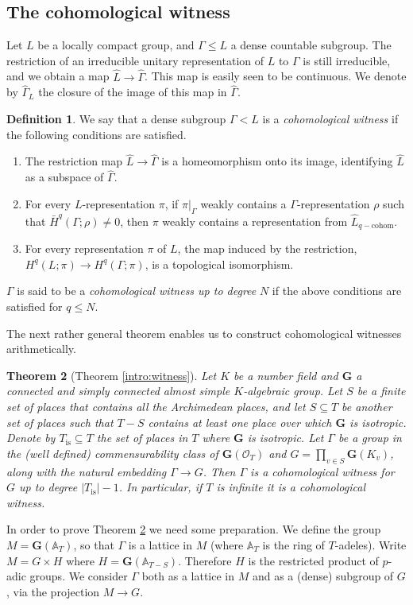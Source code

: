 \documentclass[12pt,reqno]{amsart}
\newtheorem{theorem}{Theorem}[section]
\theoremstyle{definition}
\newtheorem{definition}[theorem]{Definition}
\newcommand{\barH}{\bar{H}}
\newcommand{\abs}[1]{\left| #1 \right|}
\begin{document}
\subsection{The cohomological witness}\label{subsec:5.1}
Let $L$ be a locally compact group, and $\Gamma \leq L$ a dense countable subgroup. The restriction of an irreducible unitary representation of $L$ to $\Gamma$ is still irreducible, and we obtain a map $\widehat{L}\to \widehat{\Gamma}$. This map is easily seen to be continuous. We denote by $\widehat{\Gamma}_L$ the closure of the image of this map in $\widehat{\Gamma}$.
\begin{definition}
    We say that a dense subgroup $\Gamma<L$ is a \emph{cohomological witness} if the following conditions are satisfied.
    \begin{enumerate}
       \item The restriction map $\widehat{L}\to \widehat{\Gamma}$ is a homeomorphism onto its image, identifying $\widehat{L}$ as a subspace of $\widehat{\Gamma}$.
       \item For every $L$-representation $\pi$, if $\pi|_{\Gamma}$ weakly contains a $\Gamma$-representation $\rho$ such that $\barH^q(\Gamma;\rho) \ne 0$, then $\pi$ weakly contains a representation from $\widehat{L}_{q-\mathrm{cohom}}$.
       \item For every representation $\pi$ of $L$, the map induced by the restriction, $H^q(L;\pi) \to H^q(\Gamma;\pi)$, is a topological isomorphism.
    \end{enumerate}
    $\Gamma$ is said to be a \textit{cohomological witness up to degree} $N$ if the above conditions are satisfied for $q \leq N$.
\end{definition}
The next rather general theorem enables us to construct cohomological witnesses arithmetically. 
\begin{theorem}[Theorem \ref{intro:witness}]\label{main:wittness}
    Let $K$ be a number field and $\mathbf{G}$ a
    connected and simply connected almost simple $K$-algebraic group.
    Let $S$ be a finite set of places that contains all the Archimedean places, and let $S \subseteq T$ be another set of places such that $T - S$ contains at least one place over which $\mathbf{G}$ is isotropic. Denote by $T_{\mathrm{is}} \subseteq T$ the set of places in $T$ where $\mathbf{G}$ is isotropic.  Let $\Gamma$ be a group in the (well defined) commensurability class of $\mathbf{G}(\mathcal{O}_T)$ and $G=\prod_{v \in S} \mathbf{G}(K_v)$, along with the natural embedding $\Gamma\to G$. 
    Then $\Gamma$ is a cohomological witness for $G$ up to degree $|T_{\mathrm{is}}|-1$. In particular, if $T$ is infinite it is a cohomological witness.
\end{theorem}
In order to prove Theorem \ref{main:wittness} we need some preparation. We define the group $M=\mathbf{G}(\mathbb{A}_T)$, so that $\Gamma$ is a lattice in $M$ (where $\mathbb{A}_T$ is the ring of $T$-adeles). Write $M=G \times H$ where $H=\mathbf{G}(\mathbb{A}_{T-S})$. Therefore $H$ is the restricted product of $p$-adic groups. We consider $\Gamma$ both as a lattice in $M$ and as a (dense) subgroup of $G$, via the projection $M \to G$. 
\end{document}
